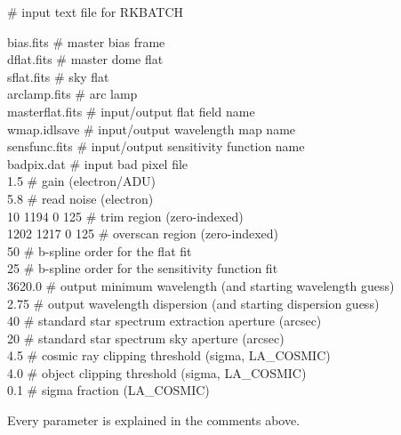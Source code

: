 \documentclass[12pt,preprint]{aastex}
\begin{document}
\begin{center}

{\scriptsize
\parbox{7in}{

\setlength{\leftmargin}{0.5in}

\# input text file for RKBATCH

bias.fits	  	\# master bias frame                                              \\
dflat.fits	  	\# master dome flat						  \\
sflat.fits	  	\# sky flat							  \\
arclamp.fits	  	\# arc lamp							  \\
masterflat.fits 	\# input/output flat field name					  \\
wmap.idlsave		\# input/output wavelength map name				  \\
sensfunc.fits		\# input/output sensitivity function name			  \\
badpix.dat	  	\# input bad pixel file						  \\
1.5		  	\# gain (electron/ADU)						  \\
5.8		  	\# read noise (electron)					  \\
10 1194 0 125	  	\# trim region (zero-indexed)					  \\
1202 1217 0 125		\# overscan region (zero-indexed)				  \\
50		  	\# b-spline order for the flat fit				  \\
25			\# b-spline order for the sensitivity function fit		  \\
3620.0		  	\# output minimum wavelength (and starting wavelength guess)	  \\
2.75		  	\# output wavelength dispersion (and starting dispersion guess)	  \\
40		  	\# standard star spectrum extraction aperture (arcsec)		  \\
20		  	\# standard star spectrum sky aperture (arcsec)			  \\
4.5		  	\# cosmic ray clipping threshold (sigma, LA\_COSMIC)		  \\
4.0		  	\# object clipping threshold (sigma, LA\_COSMIC)		  \\
0.1		  	\# sigma fraction (LA\_COSMIC)                                    \\

}
}

\end{center}

\noindent Every parameter is explained in the comments above.  
\end{document}
